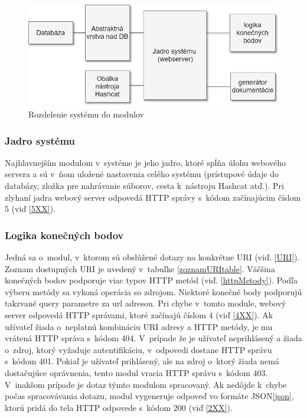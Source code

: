 \documentclass[slovak]{fitthesis}
\begin{document}
\begin{figure}[h]
    \centering
    \includegraphics[scale=0.6]{obrazky/moduly.png}
    \caption{Rozdelenie systému do modulov}
    \label{fig:moduly}
\end{figure}

\subsubsection{Jadro systému}
Najhlavnejším modulom v~systéme je jeho jadro, ktoré spĺňa úlohu webového servera a sú v~ňom uložené nastavenia celého systému (prístupové údaje do databázy, zložka pre nahrávanie súborov, cesta k~nástroju Hashcat atď.). Pri zlyhaní jadra webový server odpovedá HTTP správy s~kódom začínajúcim číslom 5 (viď \ref{5XX}).


\subsubsection{Logika konečných bodov}
Jedná sa o~modul, v~ktorom sú obslúžené dotazy na konkrétne URI (viď. \ref{URI}). Zoznam dostupných URI je uvedený v~tabuľke \ref{zoznamURItable}. Väčšina konečných bodov podporuje viac typov HTTP metód (viď. \ref{httpMetody}). Podľa výberu metódy sa vykoná operácia so zdrojom. Niektoré konečné body podporujú takzvané query parametre za url adresou. Pri chybe v~tomto module, webový server odpovedá HTTP správami, ktoré začínajú číslom 4 (viď \ref{4XX}). Ak užívateľ žiada o~neplatnú kombináciu URI adresy a HTTP metódy, je mu vrátená HTTP správa s~kódom 404. V~prípade že je užívateľ neprihlásený a žiada o~zdroj, ktorý vyžaduje autentifikáciu, v~odpovedi dostane HTTP správu s~kódom 401. Pokiaľ je užívateľ prihlásený, ale na zdroj o~ktorý žiada nemá dostačujúce oprávnenia, tento modul vracia HTTP správu s~kódom 403. V~inakšom prípade je dotaz týmto modulom spracovaný. Ak nedôjde k~chybe počas spracovávania dotazu, modul vygeneruje odpoveď vo formáte JSON\ref{json}, ktorú pridá do tela HTTP odpovede s~kódom 200 (viď \ref{2XX}).
\end{document}
